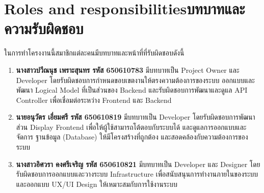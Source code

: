 \section{\ifenglish Roles and responsibilities\else บทบาทและความรับผิดชอบ\fi}
\begin{mypara}
    \indent ในการทำโครงงานนี้สมาชิกแต่ละคนมีบทบาทและหน้าที่ที่รับผิดชอบดังนี้
\end{mypara}
\begin{enumerate}
    \item \textbf{นางสาวปวีณนุช เพราะสุนทร รหัส 650610783} มีบทบาทเป็น Project Owner และ Developer 
    โดยรับผิดชอบการกำหนดขอบเขตงานให้ตรงความต้องการของระบบ ออกแบบและพัฒนา Logical Model ที่เป็นส่วนของ Backend 
    และรับผิดชอบการพัฒนาและดูแล API Controller เพื่อเชื่อมต่อระหว่าง Frontend และ Backend
    \item \textbf{นายอนุวัตร เอี่ยมศรี รหัส 650610819} มีบทบาทเป็น Developer โดยรับผิดชอบการพัฒนาส่วน Display Frontend เพื่อให้ผู้ใช้สามารถโต้ตอบกับระบบได้ และดูแลการออกแบบและจัดการ 
    ฐานข้อมูล (Database) ให้มีโครงสร้างที่ถูกต้อง และสอดคล้องกับความต้องการของระบบ
    \item \textbf{นางสาวอิศวรา คงศรีเจริญ รหัส 650610821} มีบทบาทเป็น Developer และ Designer โดยรับผิดชอบการออกแบบและวางระบบ Infrastructure เพื่อสนับสนุนการทำงานภายในของระบบ 
    และออกแบบ UX/UI Design ให้เหมาะสมกับการใช้งานระบบ
\end{enumerate}
